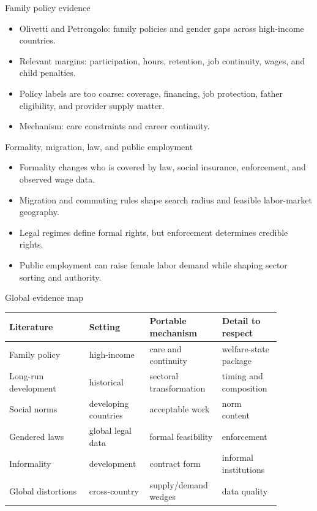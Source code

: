 \documentclass[aspectratio=169,11pt]{beamer}
\begin{document}
\begin{frame}{Family policy evidence}
\begin{itemize}
    \item Olivetti and Petrongolo: family policies and gender gaps across high-income countries.
    \item Relevant margins: participation, hours, retention, job continuity, wages, and child penalties.
    \item Policy labels are too coarse: coverage, financing, job protection, father eligibility, and provider supply matter.
    \item Mechanism: care constraints and career continuity.
\end{itemize}
\end{frame}

\begin{frame}{Formality, migration, law, and public employment}
\begin{itemize}
    \item Formality changes who is covered by law, social insurance, enforcement, and observed wage data.
    \item Migration and commuting rules shape search radius and feasible labor-market geography.
    \item Legal regimes define formal rights, but enforcement determines credible rights.
    \item Public employment can raise female labor demand while shaping sector sorting and authority.
\end{itemize}
\end{frame}

\begin{frame}{Global evidence map}
\scriptsize
\begin{tabular}{p{0.27\linewidth} p{0.20\linewidth} p{0.22\linewidth} p{0.19\linewidth}}
\toprule
Literature & Setting & Portable mechanism & Detail to respect \\
\midrule
Family policy & high-income & care and continuity & welfare-state package \\
Long-run development & historical & sectoral transformation & timing and composition \\
Social norms & developing countries & acceptable work & norm content \\
Gendered laws & global legal data & formal feasibility & enforcement \\
Informality & development & contract form & informal institutions \\
Global distortions & cross-country & supply/demand wedges & data quality \\
\bottomrule
\end{tabular}
\end{frame}
\end{document}
